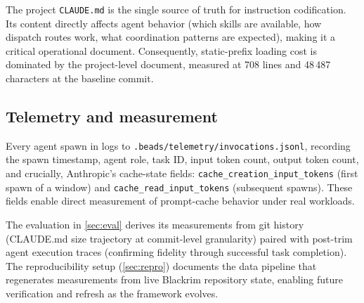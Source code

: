 The project \texttt{CLAUDE.md} is the single source of truth for instruction
codification. Its content directly affects agent behavior (which skills are
available, how dispatch routes work, what coordination patterns are expected),
making it a critical operational document. Consequently, static-prefix loading
cost is dominated by the project-level document, measured at 708 lines and
48\,487 characters at the baseline commit.

\subsection{Telemetry and measurement}

Every agent spawn in \blackrim logs to \texttt{.beads/telemetry/invocations.jsonl},
recording the spawn timestamp, agent role, task ID, input token count, output
token count, and crucially, Anthropic's cache-state fields:
\texttt{cache\_creation\_input\_tokens} (first spawn of a window) and
\texttt{cache\_read\_input\_tokens} (subsequent spawns). These fields enable
direct measurement of prompt-cache behavior under real workloads.

The evaluation in \cref{sec:eval} derives its measurements from git history
(CLAUDE.md size trajectory at commit-level granularity) paired with post-trim
agent execution traces (confirming fidelity through successful task completion).
The reproducibility setup (\cref{sec:repro}) documents the data pipeline that
regenerates measurements from live Blackrim repository state, enabling future
verification and refresh as the framework evolves.
